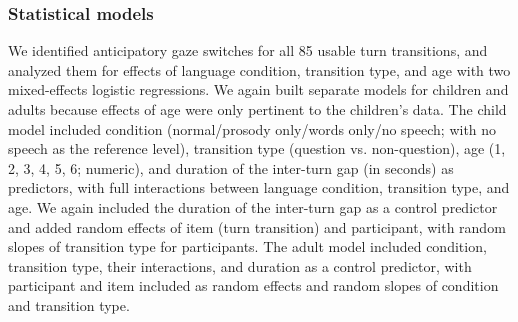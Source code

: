 \documentclass[authoryear, 12pt]{elsarticle}
\begin{document}
\subsubsection{Statistical models}
\label{sec:models2}
We identified anticipatory gaze switches for all 85 usable turn transitions, and analyzed them for effects of language condition, transition type, and age with two mixed-effects logistic regressions. We again built separate models for children and adults because effects of age were only pertinent to the children's data. The child model included condition (normal/prosody only/words only/no speech; with no speech as the reference level), transition type (question vs. non-question), age (1, 2, 3, 4, 5, 6; numeric), and duration of the inter-turn gap (in seconds) as predictors, with full interactions between language condition, transition type, and age.  We again included the duration of the inter-turn gap as a control predictor and added random effects of item (turn transition) and participant, with random slopes of transition type for participants. The adult model included condition, transition type, their interactions, and duration as a control predictor, with participant and item included as random effects and random slopes of condition and transition type.
\end{document}
